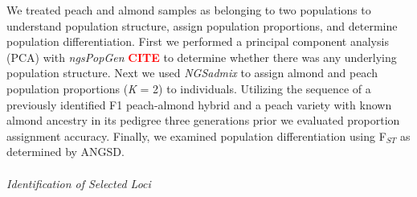 \documentclass[12pt]{article}
\newcommand{\citex}{\textcolor{red}{\bf CITE }}
\newcommand{\jri}[1]{\textcolor{red}{\emph{#1}}}
\begin{document}
We treated peach and almond samples as belonging to two populations to understand population structure, assign population proportions, and determine population differentiation. 
%
First we performed a principal component analysis (PCA) with \emph{ngsPopGen} \citex to determine whether there was any underlying population structure.
%
Next we used \emph{NGSadmix} \citep{skotte2013estimating} to assign almond and peach population proportions (\emph{K} = 2) to individuals. 
%
Utilizing the sequence of a previously identified F1 peach-almond hybrid and a peach variety with known almond ancestry in its pedigree three generations prior we evaluated proportion assignment accuracy. 
%
Finally, we examined population differentiation using F$_{ST}$ as determined by ANGSD.
\\
\\
\emph{Identification of Selected Loci}
\end{document}
